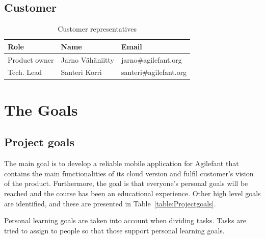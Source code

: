 \subsection{Customer}

\begin{table}[H]
\center
\begin{tabular}{|p{2cm}|p{3.8cm}|p{4.1cm}|} 
	
\hline 
\textbf{Role} & \textbf{Name} & \textbf{Email}\\ 
\hline
Product owner & Jarno Vähäniitty & jarno\#agilefant.org\\
\hline
Tech. Lead & Santeri Korri & santeri\#agilefant.org\\
\hline
\end{tabular} 
\caption{Customer representatives}
\label{table:Customer}
\end{table}



\section{The Goals}
\subsection{Project goals}

The main goal is to develop a reliable mobile application for Agilefant that
contains  the main functionalities of its cloud version and fulfil customer's
vision of  the product. Furthermore, the goal is that everyone's personal goals
will be reached and the  course has been an educational experience. Other high
level goals are identified, and these are presented in
Table~\ref{table:Projectgoals}.

Personal learning goals are taken into account when dividing tasks. Tasks are
tried to assign to people so that those support personal learning goals.


